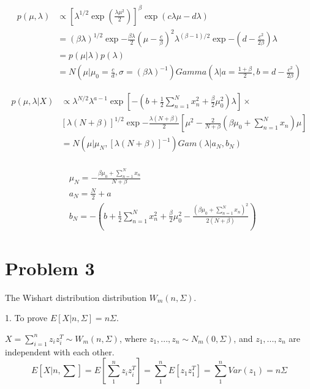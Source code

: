 \documentclass{article}
\begin{document}
\begin{equation}
\begin{aligned}
p(\mu,\lambda) &\propto \left[\lambda^{1/2} \exp(\frac{\lambda \mu^{2}}{2})\right]^{\beta} \exp(c\lambda \mu - d\lambda) \\
& = (\beta\lambda)^{1/2} \exp{-\frac{\beta \lambda}{2}\left(\mu - \frac{c}{\beta}\right)^{2}} \lambda^{(\beta-1)/2} \exp{-\left(d-\frac{c^2}{2\beta}\right)\lambda} \\
& = p(\mu|\lambda) p(\lambda) \\
& = N\left(\mu| \mu_{0}=\frac{c}{d}, \sigma = (\beta \lambda)^{-1}\right) Gamma\left(\lambda|a = \frac{1+\beta}{2},b = d-\frac{c^2}{2\beta}\right)
\end{aligned}
\end{equation}

\begin{equation}
\begin{aligned}
p(\mu,\lambda|X) &\propto \lambda^{N/2}\lambda^{a-1}\exp\left[-\left(b+\frac{1}{2}\sum_{n=1}^{N}x_{n}^{2}+\frac{\beta}{2}\mu_{0}^{2}\right)\lambda\right]\times \\
&[\lambda(N+\beta)]^{1/2}\exp{-\frac{\lambda(N+\beta)}{2}\left[\mu^{2}-\frac{2}{N+\beta}(\beta\mu_{0}+\sum_{n=1}^{N}x_{n})\mu\right]} \\
& = N(\mu | \mu_{N},[\lambda(N+\beta)]^{-1}) Gam(\lambda | a_{N},b_{N}) \\
\end{aligned}
\end{equation}

\begin{equation}
\begin{aligned}
& \mu_{N}= -\frac{\beta\mu_{0}+\sum_{n=1}^{N}x_{n}}{N+\beta}\\
& a_{N} = \frac{N}{2}+a\\
& b_{N} = -\left(b+\frac{1}{2}\sum_{n=1}^{N}x_{n}^{2}+\frac{\beta}{2}\mu_{0}^{2}-\frac{(\beta\mu_{0}+\sum_{n=1}^{N}x_{n})^{2}}{2(N+\beta)}\right)
\end{aligned}
\end{equation}


\newpage
\section{Problem 3}
The Wishart distribution distribution $W_m(n,\Sigma)$.

1. To prove $E[X|n,\Sigma]=n\Sigma$.


$X = \sum_{i=1}^{n} z_{i}z_{i}^{T} \sim W_{m}(n,\Sigma)$, where $z_{1},...,z_{n} \sim N_{m}(0,\Sigma)$, and $z_{1},...,z_{n}$ are independent with each other.
\begin{equation}
    E[X|n,\sum] =E[\sum_{1}^{n}z_{i}z_{i}^{T}] = \sum_{1}^{n}E[z_{1}z_{1}^{T}] = \sum_{1}^{n} Var(z_{1}) = n\Sigma
\end{equation}
\end{document}
